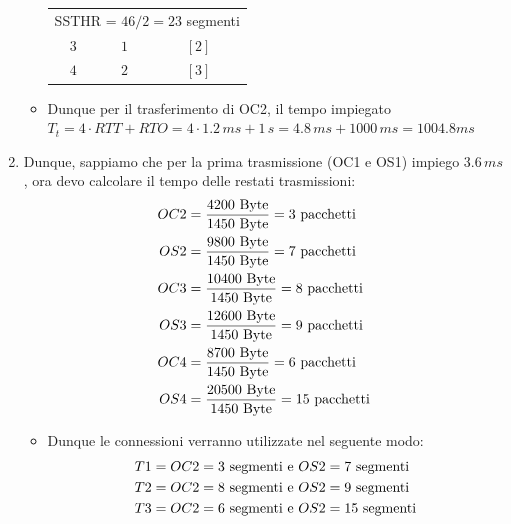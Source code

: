 \documentclass[10pt]{article}
\newcommand{\lightrule}{%
	\arrayrulecolor{black!30}%
	\midrule[\lightrulewidth]%
	\arrayrulecolor{black}}
\begin{document}
\begin{enumerate}
\begin{itemize}
\begin{center}
\begin{tabular}{@{} *{3}{c} @{}}
					\multicolumn{3}{c}{SSTHR = $46/2 = 23$ segmenti}\\
				\lightrule
					$3$ & $1$ & $[2]$ \\ 
				\lightrule
					$4$ & $2$ & $[3]$ \\
				\bottomrule
				\end{tabular}
			\end{center}
			\item Dunque per il trasferimento di OC2, il tempo impiegato $T_t = 4 \cdot RTT + RTO = 4 \cdot 1.2 \,ms + 1 \,s = 4.8 \,ms + 1000 \,ms = 1004.8 ms$
			\end{itemize}
		\item Dunque, sappiamo che per la prima trasmissione (OC1 e OS1) impiego $3.6 \,ms$, ora devo calcolare il tempo delle restati trasmissioni:
		 	\begin{equation}
			\notag
			\begin{split}
				OC2 & = \frac{4200 \textrm{ Byte}}{1450 \textrm{ Byte}} = 3 \textrm{ pacchetti}\\
				OS2 & = \frac{9800 \textrm{ Byte}}{1450 \textrm{ Byte}} = 7 \textrm{ pacchetti}\\  
				OC3 & = \frac{10400 \textrm{ Byte}}{1450 \textrm{ Byte}} = 8 \textrm{ pacchetti}\\
				OS3 & = \frac{12600 \textrm{ Byte}}{1450 \textrm{ Byte}} = 9 \textrm{ pacchetti}\\  
				OC4 & = \frac{8700 \textrm{ Byte}}{1450 \textrm{ Byte}} = 6 \textrm{ pacchetti}\\
				OS4 & = \frac{20500 \textrm{ Byte}}{1450 \textrm{ Byte}} = 15 \textrm{ pacchetti}\\  
			\end{split}
			\end{equation}
			\begin{itemize}
			\item Dunque le connessioni verranno utilizzate nel seguente modo:
			\begin{equation}
				\notag
				\begin{split}
				T1 & = OC2 = 3 \textrm{ segmenti e } OS2 = 7 \textrm{ segmenti} \\
				T2 & = OC2 = 8 \textrm{ segmenti e } OS2 = 9 \textrm{ segmenti} \\
				T3 & = OC2 = 6 \textrm{ segmenti e } OS2 = 15 \textrm{ segmenti} \\
				\end{split}
			\end{equation}

\end{itemize}
\end{enumerate}
\end{document}
